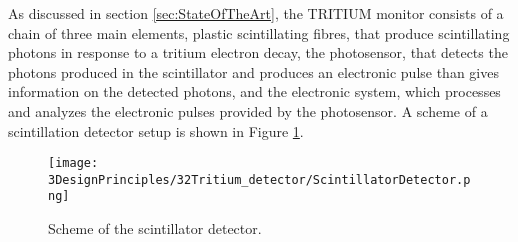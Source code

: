 As discussed in section \ref{sec:StateOfTheArt}, the TRITIUM monitor consists of a chain of three main elements, plastic scintillating fibres, that produce scintillating photons in response to a tritium electron decay, the photosensor, that detects the photons produced in the scintillator and produces an electronic pulse than gives information on the detected photons, and the electronic system, which processes and analyzes the electronic pulses provided by the photosensor. A scheme of a scintillation detector setup is shown in Figure \ref{fig:ScintillatorDetector}.

\begin{figure}[hbtp]
\texttt{[image: 3DesignPrinciples/32Tritium\_detector/ScintillatorDetector.png]}
\centering
\caption{Scheme of the scintillator detector.\label{fig:ScintillatorDetector}}
\end{figure}
